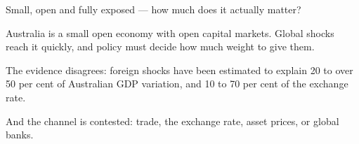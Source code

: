 \documentclass[aspectratio=169,11pt]{beamer}
\def\decksource{}
\newcommand{\src}[1]{\def\decksource{#1}}
\newcommand{\kicker}[1]{%
  {\fontsize{7.6}{9}\selectfont\color{teal}\bfseries\textls[130]{\MakeUppercase{#1}}}\par
  \vspace{0.16cm}}
\newcommand{\headline}[1]{%
  {\rmfamily\fontsize{18.4}{21.8}\selectfont\color{ink}#1\par}
  \vspace{0.34cm}}
\newcommand{\bodyfont}{\fontsize{9.7}{12.9}\selectfont}
\newcommand{\smallfont}{\fontsize{8.2}{11.2}\selectfont}
\begin{document}
\begin{frame}[t]
\src{Hendy \& Beckers (2024), RDP 2024-10}
\vspace*{0.42cm}
\kicker{1 \enspace·\enspace The question}
\headline{Small, open and fully exposed --- how much does it actually matter?}
\bodyfont

\begin{minipage}[t]{8.45cm}
\raggedright
Australia is a small open economy with open capital markets. Global shocks reach it quickly, and
policy must decide how much weight to give them.

\vspace{0.30cm}
The evidence disagrees: foreign shocks have been estimated to explain 20 to over 50 per cent of
Australian GDP variation, and 10 to 70 per cent of the exchange rate.

\vspace{0.30cm}
And the channel is contested: trade, the exchange rate, asset prices, or global banks.
\end{minipage}\hfill
\begin{minipage}[t]{5.15cm}
\end{minipage}
\end{frame}
\end{document}

